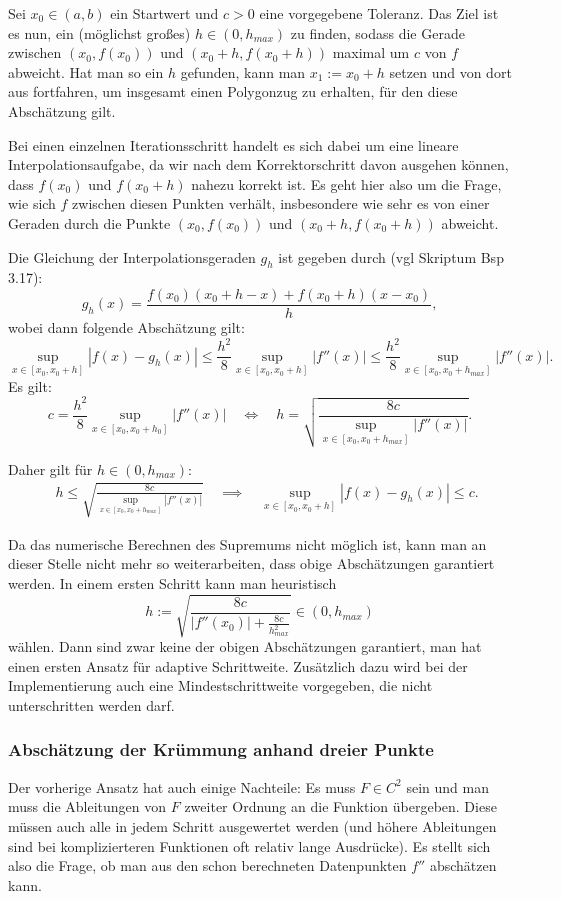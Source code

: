 \documentclass[a4paper,11pt,bibliography=totoc,listof=totoc,headinclude=true,cleardoublepage=empty,oneside]{scrartcl}
\newcounter{satz}
\begin{document}
Sei $x_0 \in (a,b)$ ein Startwert und $c>0$ eine vorgegebene Toleranz. Das Ziel ist es nun, ein (möglichst großes) $h \in (0,h_{max})$ zu finden, sodass die Gerade zwischen $(x_0,f(x_0))$ und $(x_0+h,f(x_0+h))$ maximal um $c$ von $f$ abweicht. Hat man so ein $h$ gefunden, kann man $x_1 := x_0+h$ setzen und von dort aus fortfahren, um insgesamt einen Polygonzug zu erhalten, für den diese Abschätzung gilt. 

Bei einen einzelnen Iterationsschritt handelt es sich dabei um eine lineare Interpolationsaufgabe, da wir nach dem Korrektorschritt davon ausgehen können, dass $f(x_0)$ und $f(x_0+h)$ nahezu korrekt ist. Es geht hier also um die Frage, wie sich $f$ zwischen diesen Punkten verhält, insbesondere wie sehr es von einer Geraden durch die Punkte $(x_0,f(x_0))$ und $(x_0+h,f(x_0+h))$ abweicht.

 Die Gleichung der Interpolationsgeraden $g_h$ ist gegeben durch (vgl Skriptum Bsp 3.17):
\[
g_h (x) = \frac{f(x_0)(x_0+h-x) + f(x_0+h)(x-x_0)}{h},
\]
wobei dann folgende Abschätzung gilt:
\[
\sup_{x \in [x_0,x_0+h]} |f(x)-g_h(x)|  \le \frac{h^2}{8} \sup_{x \in [x_0,x_0+h]} |f''(x)| \le \frac{h^2}{8} \sup_{x \in [x_0,x_0+h_{max}]} |f''(x)|.
\]
Es gilt:
\[
c = \frac{h^2}{8} \sup_{x \in [x_0,x_0+h_0]} |f''(x)| \quad \iff \quad h = \sqrt{ \frac{8c}{\sup_{x \in [x_0,x_0+h_{max}]} |f''(x)|}}.
\]

Daher gilt für $h \in (0,h_{max})$:
\begin{align}\label{eq:absch_h}
\quad h \le \sqrt{ \frac{8c}{\sup_{x \in [x_0,x_0+h_{max}]} |f''(x)|}} \quad \implies \quad \sup_{x \in [x_0,x_0+h]} |f(x)-g_h(x)| \le c.
\end{align}

Da das numerische Berechnen des Supremums nicht möglich ist, kann man an dieser Stelle nicht mehr so weiterarbeiten, dass obige Abschätzungen garantiert werden. In einem ersten Schritt kann man heuristisch
\[
h := \sqrt{\frac{8c}{|f''(x_0)| +\frac{8c}{h_{max}^2} }} \in (0,h_{max})
\]
wählen. Dann sind zwar keine der obigen Abschätzungen garantiert, man hat einen ersten Ansatz für adaptive Schrittweite. Zusätzlich dazu wird bei der Implementierung auch eine Mindestschrittweite vorgegeben, die nicht unterschritten werden darf. 

\subsubsection{Abschätzung der Krümmung anhand dreier Punkte}\label{chap:5.1.2}
Der vorherige Ansatz hat auch einige Nachteile: Es muss $F \in C^2$ sein und man muss die Ableitungen von $F$ zweiter Ordnung an die Funktion übergeben. Diese müssen auch alle in jedem Schritt ausgewertet werden (und höhere Ableitungen sind bei komplizierteren Funktionen oft relativ lange Ausdrücke). Es stellt sich also die Frage, ob man aus den schon berechneten Datenpunkten $f''$ abschätzen kann.
\end{document}
